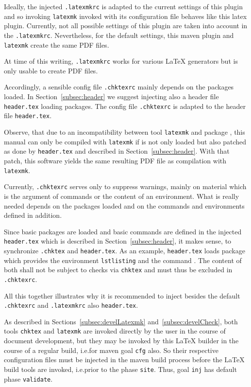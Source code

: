 Ideally, the injected \texttt{.latexmkrc} is adapted to the current settings of this plugin 
and so invoking \texttt{latexmk} invoked with its configuration file 
behaves like this latex plugin. 
Currently, not all possible settings of this plugin 
are taken into account in the \texttt{.latexmkrc}. 
Nevertheless, for the default settings, 
this maven plugin and \texttt{latexmk} create the same PDF files. 

At time of this writing, \texttt{.latexmkrc} works for various \LaTeX{} generators 
but is only usable to create PDF files. 

Accordingly, a sensible config file \texttt{.chktexrc} mainly depends on the packages loaded. 
In Section~\ref{subsec:header} we suggest injecting also a header file \texttt{header.tex} 
loading packages. 
The config file \texttt{.chktexrc} is adapted to the header file \texttt{header.tex}. 

Observe, that due to an incompatibility between tool \texttt{latexmk} and package , 
this manual can only be compiled with \texttt{latexmk} 
if  is not only loaded but also patched 
as done by \texttt{header.tex} and described in Section~\ref{subsec:header}. 
With that patch, this software yields the same resulting PDF file 
as compilation with \texttt{latexmk}. 

Currently, \texttt{.chktexrc} serves only to suppress warnings, 
mainly on material which is the argument of commands or the content of an environment. 
What is really needed depends on the packages loaded 
and on the commands and environments defined in addition. 

Since basic packages are loaded and basic commands are defined 
in the injected \texttt{header.tex} 
which is described in Section~\ref{subsec:header}, 
it makes sense, to synchronize \texttt{.chktex} and \texttt{header.tex}. 
As an example, \texttt{header.tex} loads package  
which provides the environment \texttt{lstlisting} and the command . 
The content of both shall not be subject to checks via \texttt{chktex} 
and must thus be excluded in \texttt{.chktexrc}. 


All this together illustrates why it is recommended to inject 
besides the default \texttt{.chktexrc} and \texttt{.latexmkrc} 
also \texttt{header.tex}. 
\medskip


As described in Sections~\ref{subsec:develLatexmk} and~\ref{subsec:develCheck}, 
both tools \texttt{chktex} and \texttt{latexmk} 
are invoked directly by the user in the course of document development, 
but they may be invoked by this \LaTeX{} builder in the course of a regular build, 
i.e.\@ for maven goal \texttt{cfg} also. 
So their respective configuration files must be injected 
in the maven build process before the \LaTeX{} build tools are invoked, 
i.e.\@ prior to the phase \texttt{site}. 
Thus, goal \texttt{inj} has default phase \texttt{validate}. 



